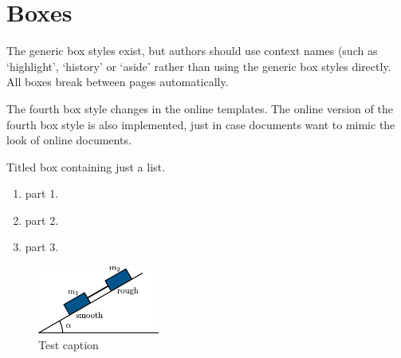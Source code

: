 \documentclass[solutionsatend,twocolumnsolutions]{ouunit}
\begin{document}
\section{Boxes}
The generic box styles exist, but authors should use context names (such as `highlight', `history' or `aside' rather than using the generic box styles directly. All boxes break between pages automatically.
\begin{style1box}

\lipsum[133]
\lipsum[133]
\end{style1box}
\lipsum[133]
\begin{style2box}
\lipsum[2]
\end{style2box}
\lipsum[133]
\begin{style3box}
\lipsum[3]
\end{style3box}
\lipsum[133]
\begin{style4box}
\lipsum[4]
\end{style4box}
The fourth box style changes in the online templates. The online version of the fourth box style is also implemented, just in case documents want to mimic the look of online documents.
\begin{onlinestyle4box}
\lipsum[4]
\end{onlinestyle4box}
Titled box containing just a list.
\begin{style4box}[Solution]
\begin{enumerate}
\item part 1.
\item part 2.
\item part 3.
\end{enumerate}
\end{style4box}
\lipsum[133]
\begin{style2box}
\begin{figure}
\caption{Test caption}
\includegraphics[width=4cm]{test}
\end{figure}
\end{style2box}
\end{document}
